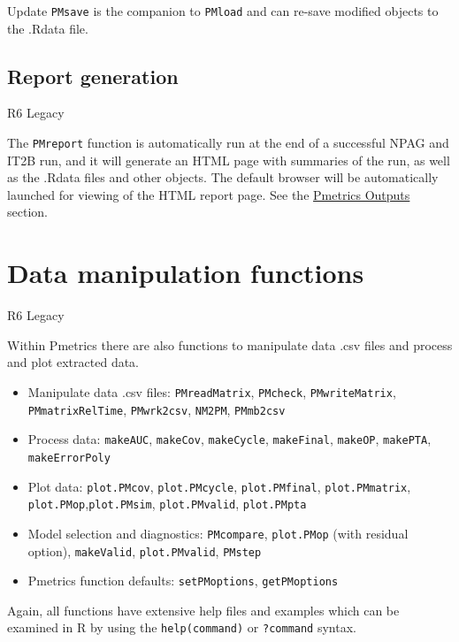 \documentclass[
]{book}
\begin{document}
{Update}
\texttt{PMsave} is the
companion to \texttt{PMload} and can re-save modified objects to the .Rdata file.

\hypertarget{report-generation}{%
\subsection{Report generation}\label{report-generation}}

{R6} {Legacy}

The \texttt{PMreport} function is automatically run at the end of a successful
NPAG and IT2B run, and it will generate an HTML page with summaries of
the run, as well as the .Rdata files and other objects. The default
browser will be automatically launched for viewing of the HTML report
page. See the \protect\hyperlink{outputs}{Pmetrics
Outputs} section.

\hypertarget{data-manipulation-functions}{%
\section{Data manipulation functions}\label{data-manipulation-functions}}

{R6} {Legacy}

Within Pmetrics there are also functions to manipulate data .csv files
and process and plot extracted data.

\begin{itemize}
\item
  Manipulate data .csv files: \texttt{PMreadMatrix}, \texttt{PMcheck}, \texttt{PMwriteMatrix},
  \texttt{PMmatrixRelTime}, \texttt{PMwrk2csv}, \texttt{NM2PM}, \texttt{PMmb2csv}
\item
  Process data: \texttt{makeAUC}, \texttt{makeCov}, \texttt{makeCycle}, \texttt{makeFinal}, \texttt{makeOP}, \texttt{makePTA},
  \texttt{makeErrorPoly}
\item
  Plot data: \texttt{plot.PMcov}, \texttt{plot.PMcycle}, \texttt{plot.PMfinal}, \texttt{plot.PMmatrix},
  \texttt{plot.PMop},\texttt{plot.PMsim}, \texttt{plot.PMvalid}, \texttt{plot.PMpta}
\item
  Model selection and diagnostics: \texttt{PMcompare}, \texttt{plot.PMop} (with residual
  option), \texttt{makeValid}, \texttt{plot.PMvalid}, \texttt{PMstep}
\item
  Pmetrics function defaults: \texttt{setPMoptions}, \texttt{getPMoptions}
\end{itemize}

Again, all functions have extensive help files and examples which can be
examined in R by using the \texttt{help(command)} or \texttt{?command} syntax.
\end{document}
